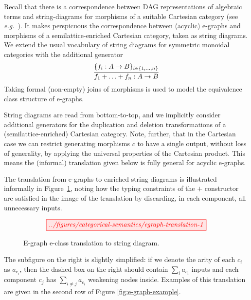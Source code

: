 Recall that there is a correspondence between DAG representations of algebraic terms and  string-diagrams for morphisms of a suitable Cartesian category (see \textit{e.g.}~\cite{ghica-zanassi2023string}).
It makes perspicuous the correspondence between (acyclic) e-graphs and morphisms of a semilattice-enriched Cartesian category, taken as string diagrams.
We extend the usual vocabulary of string diagrams for symmetric monoidal categories with the additional generator
\[
\infer{f_1 + \ldots + f_n: A \to B}{\{f_i: A \to B\}_{i \in \{1,\ldots,n\}}}
\]
Taking formal (non-empty) joins of morphisms is used to model the equivalence class structure of e-graphs.

String diagrams are read from bottom-to-top, and we implicitly consider additional generators for the duplication and deletion transformations of a (semilattice-enriched) Cartesian category.
Note, further, that in the Cartesian case we can restrict generating morphisms $c$ to have a single output,  without loss of generality,  by applying the universal properties of the Cartesian product.  
This means the (informal) translation given below is fully general for acyclic e-graphs. 

The translation from e-graphs to enriched string diagrams is illustrated informally in Figure~\ref{fig:e-graph-to-string},
noting how the typing constraints of the $+$ constructor are satisfied in the image of the translation by discarding, in each component, all unnecessary inputs.

\begin{figure}
\[
    \tikzfig{../figures/categorical-semantics/egraph-translation-1}
\]
\caption{E-graph e-class translation to string diagram.}
\label{fig:e-graph-to-string}
\end{figure}
The subfigure on the right is slightly simplified: if we denote the arity of each $c_i$ as $a_{c_{i}}$, then the dashed box on the right should contain $\sum\limits_{i} a_{c_{i}}$ inputs and each component $c_j$ has $\sum\limits_{i \not = j} a_{c_{i}}$ weakening nodes inside.
Examples of this translation are given in the second row of Figure \ref{fig:e-graph-example}.

